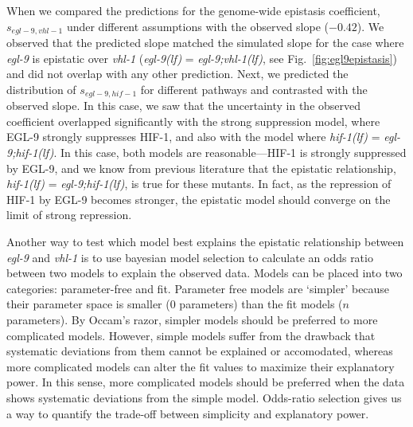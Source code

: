 \documentclass[9pt,twocolumn,twoside]{pnas-new}
\newcommand{\gene}[1]{\emph{#1}}
\newcommand{\egl}{\emph{egl-9(lf)}}
\newcommand{\eglvhl}{\emph{egl-9;vhl-1(lf)}}
\newcommand{\eglhif}{\emph{egl-9;hif-1(lf)}}
\newcommand{\hif}{\emph{hif-1(lf)}}
\newcommand{\eglp}{EGL-9}
\newcommand{\hifp}{HIF-1}
\begin{document}
When we compared the predictions for the genome-wide epistasis coefficient,
$s_{egl-9,vhl-1}$ under different assumptions with the observed slope ($-0.42$). We
observed that the predicted slope matched the simulated slope for the case where
\gene{egl-9} is epistatic over \gene{vhl-1} (\egl{} = \eglvhl{}, see
Fig.~\ref{fig:egl9epistasis}) and did not overlap with any other prediction.
Next, we predicted the distribution of $s_{egl-9,hif-1}$ for different pathways
and contrasted with the observed slope. In this case, we saw that the uncertainty
in the observed coefficient overlapped significantly with the strong suppression
model, where \eglp{} strongly suppresses \hifp{}, and also with the model where
\hif{} = \eglhif{}. In this case, both models are reasonable---\hifp{} is strongly
suppressed by \eglp{}, and we know from previous literature that the epistatic
relationship, \hif{} = \eglhif{}, is true for these mutants. In fact, as the
repression of \hifp{} by \eglp{} becomes stronger, the epistatic model should converge
on the limit of strong repression.

Another way to test which model best explains the epistatic relationship between
\gene{egl-9} and \gene{vhl-1} is to use bayesian model selection to calculate
an odds ratio between two models to explain the observed data. Models can be placed
into two categories: parameter-free and fit. Parameter free models are `simpler'
because their parameter space is smaller (0 parameters) than the fit models ($n$
parameters). By Occam's razor, simpler models should be preferred to more
complicated models. However, simple models suffer from the drawback that
systematic deviations from them cannot be explained or accomodated, whereas more
complicated models can alter the fit values to maximize their explanatory power.
In this sense, more complicated models should be preferred when the data shows
systematic deviations from the simple model. Odds-ratio selection gives us a way
to quantify the trade-off between simplicity and explanatory power.
\end{document}
